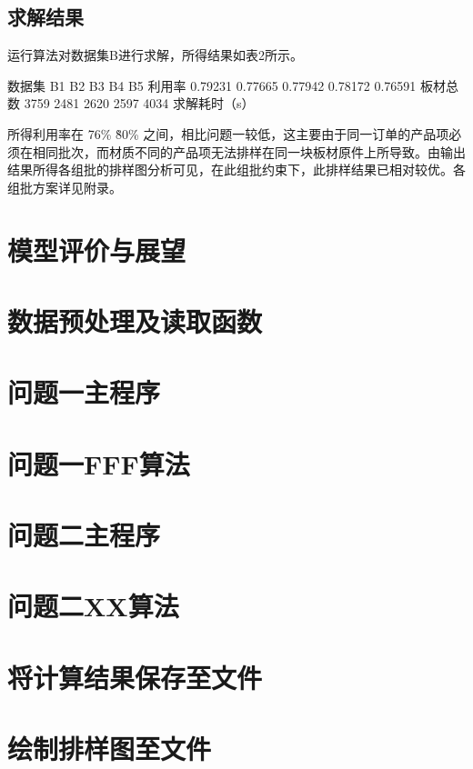 \documentclass[bwprint]{gmcmthesis}
\begin{document}
\subsection{求解结果}

	运行算法对数据集B进行求解，所得结果如表2所示。
		
	数据集           B1            B2            B3           B4           B5
	利用率        0.79231       0.77665       0.77942        0.78172      0.76591
    板材总数	      3759          2481           2620         2597         4034
	求解耗时（s）

	所得利用率在 76\% \~ 80\% 之间，相比问题一较低，这主要由于同一订单的产品项必须在相同批次，而材质不同的产品项无法排样在同一块板材原件上所导致。由输出结果所得各组批的排样图分析可见，在此组批约束下，此排样结果已相对较优。各组批方案详见附录。

\section{模型评价与展望}





\newpage
\quad
\newpage





\cite{mittelbach_latex_2004,wright_latex3_2009,beeton_unicode_2008,vieth_experiences_2009}

\newpage
\appendix
\setcounter{page}{1} %
\section{数据预处理及读取函数}

\section{问题一主程序}

\section{问题一FFF算法}

\section{问题二主程序}

\section{问题二XX算法}

\section{将计算结果保存至文件}

\section{绘制排样图至文件}

\end{document}
